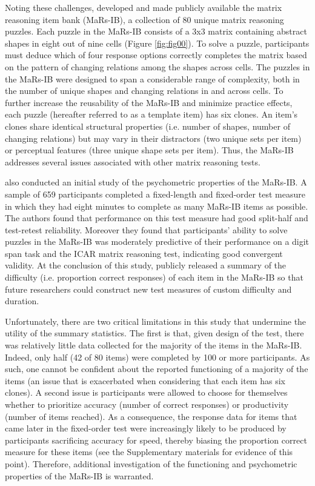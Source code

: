 \documentclass[a4paper,man,natbib]{apa6}
\begin{document}
Noting these challenges, \cite{chierchia2019matrix} developed and made publicly available the matrix reasoning item bank (MaRs-IB), a collection of 80 unique matrix reasoning puzzles. Each puzzle in the MaRs-IB consists of a 3x3 matrix containing abstract shapes in eight out of nine cells (Figure \ref{fig:fig00}). To solve a puzzle, participants must deduce which of four response options correctly completes the matrix based on the pattern of changing relations among the shapes across cells. The puzzles in the MaRs-IB were designed to span a considerable range of complexity, both in the number of unique shapes and changing relations in and across cells. To further increase the reusability of the MaRs-IB and minimize practice effects, each puzzle (hereafter referred to as a template item) has six clones. An item's clones share identical structural properties (i.e. number of shapes, number of changing relations) but may vary in their distractors (two unique sets per item) or perceptual features (three unique shape sets per item). Thus, the MaRs-IB addresses several issues associated with other matrix reasoning tests.   

\cite{chierchia2019matrix} also conducted an initial study of the psychometric properties of the MaRs-IB. A sample of 659 participants completed a fixed-length and fixed-order test measure in which they had eight minutes to complete as many MaRs-IB items as possible. The authors found that performance on this test measure had good split-half and test-retest reliability. Moreover they found that participants' ability to solve puzzles in the MaRs-IB was moderately predictive of their performance on a digit span task and the ICAR matrix reasoning test, indicating good convergent validity. At the conclusion of this study, \cite{chierchia2019matrix} publicly released a summary of the difficulty (i.e. proportion correct responses) of each item in the MaRs-IB so that future researchers could construct new test measures of custom difficulty and duration.

Unfortunately, there are two critical limitations in this study that undermine the utility of the summary statistics. The first is that, given design of the test, there was relatively little data collected for the majority of the items in the MaRs-IB. Indeed, only half (42 of 80 items) were completed by 100 or more participants. As such, one cannot be confident about the reported functioning of a majority of the items (an issue that is exacerbated when considering that each item has six clones). A second issue is participants were allowed to choose for themselves whether to prioritize accuracy (number of correct responses) or productivity (number of items reached). As a consequence, the response data for items that came later in the fixed-order test were increasingly likely to be produced by participants sacrificing accuracy for speed, thereby biasing the proportion correct measure for these items (see the Supplementary materials for evidence of this point). Therefore, additional investigation of the functioning and psychometric properties of the MaRs-IB is warranted.
\end{document}
